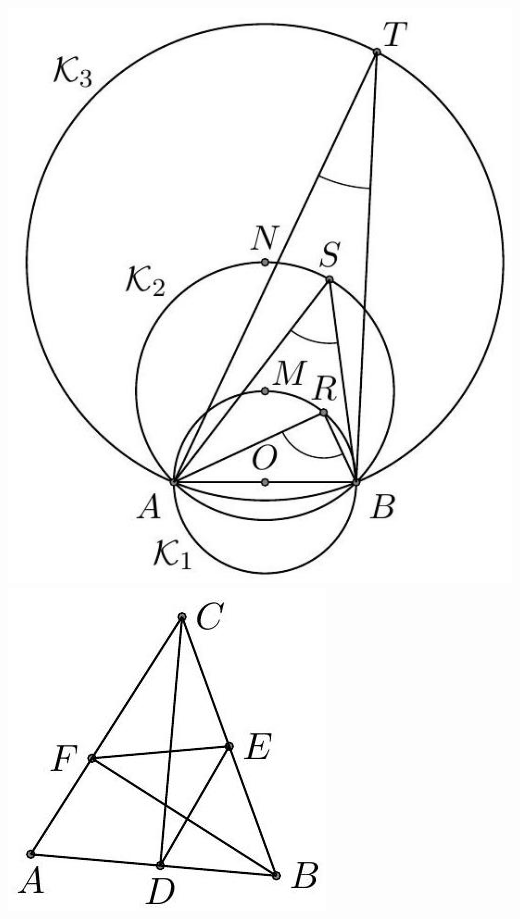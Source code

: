 \documentclass[10pt]{article}
\begin{document}
\includegraphics[max width=\textwidth, center]{2024_11_21_71f62bd117d375398909g-189(1)}\\
\includegraphics[max width=\textwidth, center]{2024_11_21_71f62bd117d375398909g-190(2)}\\
\end{document}
